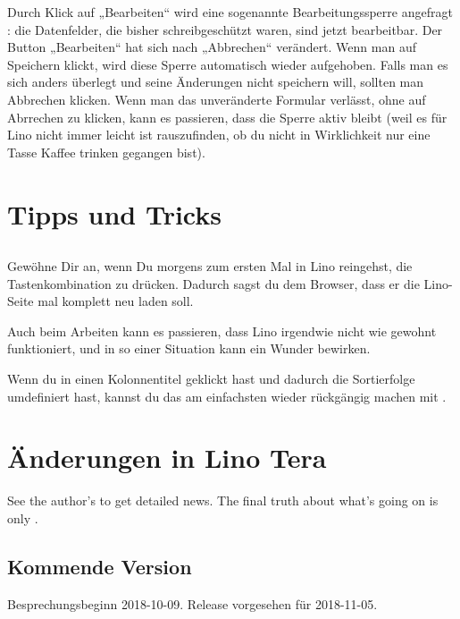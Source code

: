 \documentclass[letterpaper,10pt,ngerman]{sphinxmanual}
\begin{document}
Durch Klick auf „Bearbeiten“ wird eine sogenannte Bearbeitungssperre
angefragt : die Datenfelder, die bisher schreibgeschützt waren, sind
jetzt bearbeitbar. Der Button „Bearbeiten“ hat sich nach „Abbrechen“
verändert. Wenn man auf Speichern klickt, wird diese Sperre
automatisch wieder aufgehoben. Falls man es sich anders überlegt und
seine Änderungen nicht speichern will, sollten man Abbrechen klicken.
Wenn man das unveränderte Formular verlässt, ohne auf Abrrechen zu
klicken, kann es passieren, dass die Sperre aktiv bleibt (weil es für
Lino nicht immer leicht ist rauszufinden, ob du nicht in Wirklichkeit
nur eine Tasse Kaffee trinken gegangen bist).


\chapter{Tipps und Tricks}
\label{\detokenize{tricks:tipps-und-tricks}}\label{\detokenize{tricks::doc}}

\section{}
\label{\detokenize{tricks:shift-ctrl-r}}
Gewöhne Dir an, wenn Du morgens zum ersten Mal in Lino reingehst, die
Tastenkombination  zu drücken. Dadurch sagst du dem
Browser, dass er die Lino-Seite mal komplett neu laden soll.

Auch beim Arbeiten kann es passieren, dass Lino irgendwie nicht wie
gewohnt funktioniert, und in so einer Situation kann ein
 Wunder bewirken.

Wenn du in einen Kolonnentitel geklickt hast und dadurch die
Sortierfolge umdefiniert hast, kannst du das am einfachsten wieder
rückgängig machen mit .


\chapter{Änderungen in Lino Tera}
\label{\detokenize{changes/index:anderungen-in-lino-tera}}\label{\detokenize{changes/index:tera-changes}}\label{\detokenize{changes/index::doc}}
See the author’s 
to get detailed news.  The final truth about what’s going on is only
.


\section{Kommende Version}
\label{\detokenize{changes/coming:kommende-version}}\label{\detokenize{changes/coming:tera-coming}}\label{\detokenize{changes/coming::doc}}
Besprechungsbeginn 2018-10-09.
Release vorgesehen für 2018-11-05.
\end{document}
